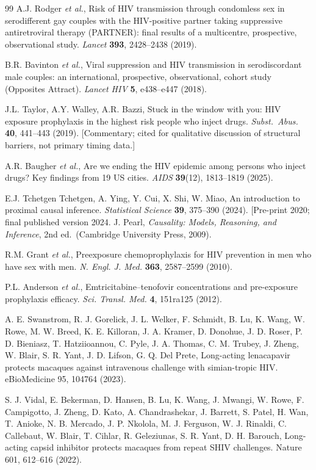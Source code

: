 \documentclass[11pt]{article}
\theoremstyle{definition}
\theoremstyle{remark}
\begin{document}
\begin{thebibliography}{99}
A.J. Rodger \textit{et al.}, Risk of HIV transmission through condomless sex in serodifferent gay couples with the HIV-positive partner taking suppressive antiretroviral therapy (PARTNER): final results of a multicentre, prospective, observational study. \textit{Lancet} \textbf{393}, 2428--2438 (2019).

B.R. Bavinton \textit{et al.}, Viral suppression and HIV transmission in serodiscordant male couples: an international, prospective, observational, cohort study (Opposites Attract). \textit{Lancet HIV} \textbf{5}, e438--e447 (2018).

J.L. Taylor, A.Y. Walley, A.R. Bazzi, Stuck in the window with you: HIV exposure prophylaxis in the highest risk people who inject drugs. \textit{Subst.\ Abus.} \textbf{40}, 441--443 (2019). [Commentary; cited for qualitative discussion of structural barriers, not primary timing data.]

A.R. Baugher \textit{et al.}, Are we ending the HIV epidemic among persons who inject drugs? Key findings from 19 US cities. \textit{AIDS} \textbf{39}(12), 1813--1819 (2025). 

E.J. Tchetgen Tchetgen, A. Ying, Y. Cui, X. Shi, W. Miao, An introduction to proximal causal inference. \textit{Statistical Science} \textbf{39}, 375--390 (2024). [Pre-print 2020; final published version 2024.
J. Pearl, \textit{Causality: Models, Reasoning, and Inference}, 2nd ed.\ (Cambridge University Press, 2009).

R.M. Grant \textit{et al.}, Preexposure chemoprophylaxis for HIV prevention in men who have sex with men. \textit{N. Engl. J. Med.} \textbf{363}, 2587--2599 (2010).

P.L. Anderson \textit{et al.}, Emtricitabine--tenofovir concentrations and pre-exposure prophylaxis efficacy. \textit{Sci. Transl. Med.} \textbf{4}, 151ra125 (2012).

A. E. Swanstrom, R. J. Gorelick, J. L. Welker, F. Schmidt, B. Lu, K. Wang, W. Rowe, M. W. Breed, K. E. Killoran, J. A. Kramer, D. Donohue, J. D. Roser, P. D. Bieniasz, T. Hatziioannou, C. Pyle, J. A. Thomas, C. M. Trubey, J. Zheng, W. Blair, S. R. Yant, J. D. Lifson, G. Q. Del Prete, Long-acting lenacapavir protects macaques against intravenous challenge with simian-tropic HIV. eBioMedicine 95, 104764 (2023).

S. J. Vidal, E. Bekerman, D. Hansen, B. Lu, K. Wang, J. Mwangi, W. Rowe, F. Campigotto, J. Zheng, D. Kato, A. Chandrashekar, J. Barrett, S. Patel, H. Wan, T. Anioke, N. B. Mercado, J. P. Nkolola, M. J. Ferguson, W. J. Rinaldi, C. Callebaut, W. Blair, T. Cihlar, R. Geleziunas, S. R. Yant, D. H. Barouch, Long-acting capsid inhibitor protects macaques from repeat SHIV challenges. Nature 601, 612–616 (2022).


\end{thebibliography}
\end{document}
